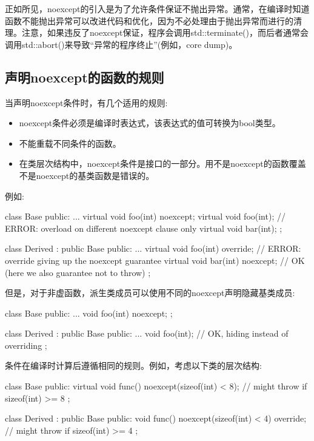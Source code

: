 正如所见，noexcept的引入是为了允许条件保证不抛出异常。通常，在编译时知道函数不能抛出异常可以改进代码和优化，因为不必处理由于抛出异常而进行的清理。注意，如果违反了noexcept保证，程序会调用std::terminate()，而后者通常会调用std::abort()来导致“异常的程序终止”(例如，core dump)。

\subsection{声明noexcept的函数的规则}

当声明noexcept条件时，有几个适用的规则:

\begin{itemize}
	\item noexcept条件必须是编译时表达式，该表达式的值可转换为bool类型。
	\item 不能重载不同条件的函数。
	\item 在类层次结构中，noexcept条件是接口的一部分。用不是noexcept的函数覆盖不是noexcept的基类函数是错误的。
\end{itemize}

例如:

\begin{cppcode}
class Base {
	public:
	...
	virtual void foo(int) noexcept;
	virtual void foo(int); // ERROR: overload on different noexcept clause only
	virtual void bar(int);
};

class Derived : public Base {
	public:
	...
	virtual void foo(int) override; // ERROR: override giving up the noexcept guarantee
	virtual void bar(int) noexcept; // OK (here we also guarantee not to throw)
};
\end{cppcode}

但是，对于非虚函数，派生类成员可以使用不同的noexcept声明隐藏基类成员:

\begin{cppcode}
class Base {
	public:
	...
	void foo(int) noexcept;
};

class Derived : public Base {
	public:
	...
	void foo(int); // OK, hiding instead of overriding
};
\end{cppcode}

条件在编译时计算后遵循相同的规则。例如，考虑以下类的层次结构:

\begin{cppcode}
class Base {
	public:
	virtual void func() noexcept(sizeof(int) < 8); // might throw if sizeof(int) >= 8
};

class Derived : public Base {
	public:
	void func() noexcept(sizeof(int) < 4) override; // might throw if sizeof(int) >= 4
};
\end{cppcode}

